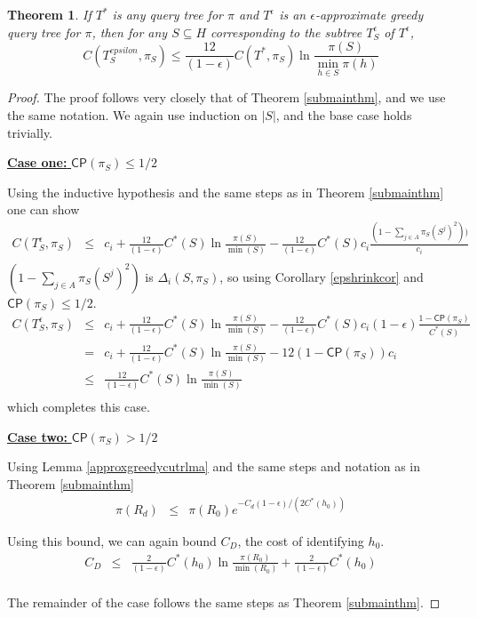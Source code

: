 \documentclass{article}
\newtheorem{theorem}{Theorem}
\begin{document}
\begin{theorem}If $T^*$ is any query tree for $\pi$ and $T^{\epsilon}$ is an
$\epsilon$-approximate greedy query tree for $\pi$,
then for any $S \subseteq H$ corresponding to the subtree $T^{\epsilon}_S$ of 
$T^{\epsilon}$,
\[ C(T^{epsilon}_S, \pi_S) \leq 
\frac{12}{(1 - \epsilon)} C(T^*, \pi_S) \ln \frac{\pi(S)}{\min_{h \in S}\pi(h)} \]
\end{theorem}

\begin{proof}
The proof follows very closely that of Theorem \ref{submainthm}, and we
use the same notation.  We again use induction on $|S|$, and the
base case holds trivially.

\noindent \underline{\textbf{Case one:} $\mathsf{CP}(\pi_S) \leq 1/2$}

Using the inductive hypothesis and
the same steps as in Theorem \ref{submainthm} one can show
\begin{eqnarray*}
C(T^{\epsilon}_S, \pi_S)
& \leq & c_i + \frac{12}{(1-\epsilon)} C^*(S) \ln \frac{\pi(S)}{\min(S)} -
\frac{12}{(1-\epsilon)} C^*(S) c_i \frac{(1 - \sum_{j \in A}\pi_S(S^j)^2))}{c_i} \\
\end{eqnarray*}
$(1 - \sum_{j \in A}\pi_S(S^j)^2)$ is 
$\Delta_i(S, \pi_S)$, so using Corollary \ref{epshrinkcor} and
$\mathsf{CP}(\pi_S) \leq 1/2$.
\begin{eqnarray*}
C(T^{\epsilon}_S, \pi_S)
& \leq & c_i + \frac{12}{(1-\epsilon)} C^*(S) \ln \frac{\pi(S)}{\min(S)}
- \frac{12}{(1-\epsilon)} C^*(S) c_i (1-\epsilon) 
\frac{1 - \mathsf{CP}(\pi_S)}{C^*(S)} \\
& = & c_i + \frac{12}{(1-\epsilon)} C^*(S) \ln \frac{\pi(S)}{\min(S)}
- 12 (1 - \mathsf{CP}(\pi_S)) c_i \\
& \leq & \frac{12}{(1-\epsilon)} C^*(S) \ln \frac{\pi(S)}{\min(S)} \\
\end{eqnarray*}
which completes this case.

\noindent \underline{\textbf{Case two:} $\mathsf{CP}(\pi_S) > 1/2$}

Using Lemma \ref{approxgreedycutrlma} and the same steps and notation as in 
Theorem \ref{submainthm}
\begin{eqnarray*}
\pi(R_d) & \leq & \pi(R_0) e^{-C_d (1-\epsilon) / (2C^*(h_0))} 
\end{eqnarray*}

Using this bound, we can again bound $C_D$, the cost of identifying
$h_0$. 
\begin{eqnarray*}
C_{D} & \leq & \frac{2}{(1-\epsilon)} C^*(h_0) \ln\frac{\pi(R_0)}{\min(R_0)} + 
\frac{2}{(1-\epsilon)} C^*(h_0) \\
\end{eqnarray*}

The remainder of the case follows the same steps as Theorem \ref{submainthm}. 
\end{proof}
\end{document}
